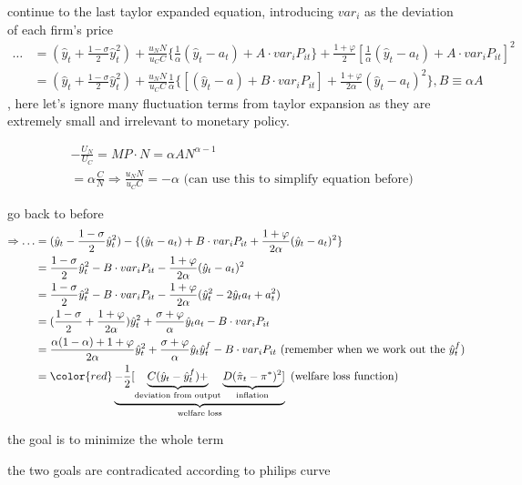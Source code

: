 continue to the last taylor expanded equation, introducing $var_i$ as the deviation of each firm's price
\begin{align}
\dots &= (\hat y_t +\frac{1-\sigma}{2}\hat y_t^2)+\frac{u_N N}{u_C C}\{\frac{1}{\alpha}(\hat y_t -a_t)+A \cdot var_i P_{it}\}+\frac{1+\varphi}{2}[\frac{1}{\alpha}(\hat y_t - a_t)+A \cdot var_i P_{it}]^2
\\& = (\hat y_t +\frac{1-\sigma}{2}\hat y_t^2)+\frac{u_N N}{u_C C}\frac{1}{\alpha}\{[(\hat y_t -a)+B \cdot var_i P_{it}]+\frac{1+\varphi}{2 \alpha}(\hat y_t -a_t)^2\}, B\equiv \alpha A
\end{align}
, here let's ignore many fluctuation terms from taylor expansion as they are extremely small and irrelevant to monetary policy.

\begin{align}
& -\frac{U_N}{U_C}=MP \cdot N=\alpha A N^{\alpha-1}
\\& = \alpha \frac{C}{N} \Rightarrow \frac{u_N N}{u_C C}=-\alpha\text{ (can use this to simplify equation before)}
\end{align}

go back to before
\begin{align}
\Rightarrow \dots & = (\hat y_t -\frac{1-\sigma}{2}\hat y_t^2)-\{(\hat y_t -a_t)+B \cdot var_i P_{it}+\frac{1+\varphi}{2 \alpha}(\hat y_t -a_t)^2\}
\\& =\frac{1-\sigma}{2}\hat y_t^2 -B \cdot var_i P_{it}-\frac{1+\varphi}{2 \alpha}(\hat y_t -a_t)^2
\\& = \frac{1-\sigma}{2}\hat y_t^2 -B \cdot var_i P_{it}-\frac{1+\varphi}{2 \alpha}(\hat y_t^2-2 \hat y_t a_t +a_t^2)
\\& = (\frac{1-\sigma}{2}+\frac{1+\varphi}{2 \alpha})\hat y_t^2 + \frac{\sigma+\varphi}{\alpha}\hat y_t a_t -B \cdot var_i P_{it}
\\& =  \frac{\alpha (1-\alpha)+1+\varphi}{2 \alpha}\hat y_t^2 + \frac{\sigma+\varphi}{\alpha}\hat y_t \hat y_t^f -B \cdot var_i P_{it} \text{ (remember when we work out the $\hat y_t^f$)}
\\& =
\color{red}
\underbrace{
-\frac{1}{2}[
\underbrace{
C(\hat y_t -\hat y_t^f)+
}_\text{deviation from output}
\underbrace{
D(\hat \pi_t - \pi^*)^2
}_\text{inflation}
]
}_\text{welfare loss} \text{ (welfare loss function)}
\end{align}

the goal is to minimize the whole term


\begin{blueblock}
\begin{note}
\end{note}
the two goals are contradicated according to philips curve
\end{blueblock}

